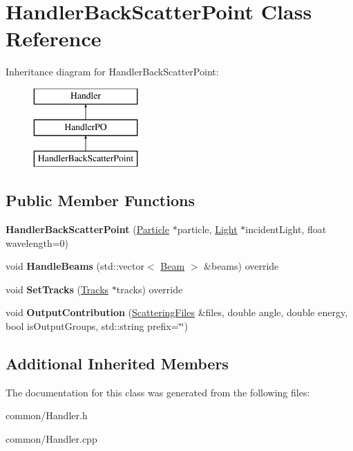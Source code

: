 \hypertarget{class_handler_back_scatter_point}{}\section{Handler\+Back\+Scatter\+Point Class Reference}
\label{class_handler_back_scatter_point}
Inheritance diagram for Handler\+Back\+Scatter\+Point\+:\begin{figure}[H]
\begin{center}
\leavevmode
\includegraphics[height=3.000000cm]{class_handler_back_scatter_point}
\end{center}
\end{figure}
\subsection*{Public Member Functions}
\begin{DoxyCompactItemize}
\item 
\mbox{\label{class_handler_back_scatter_point_ac1062d361d234fe7f17169cb878000dd}} 
{\bfseries Handler\+Back\+Scatter\+Point} (\mbox{\hyperlink{class_particle}{Particle}} $\ast$particle, \mbox{\hyperlink{class_light}{Light}} $\ast$incident\+Light, float wavelength=0)
\item 
\mbox{\label{class_handler_back_scatter_point_a3ce7fcb7530abbdfd8b1256d7e588536}} 
void {\bfseries Handle\+Beams} (std\+::vector$<$ \mbox{\hyperlink{class_beam}{Beam}} $>$ \&beams) override
\item 
\mbox{\label{class_handler_back_scatter_point_ac8e90fbda71ee4cde2b4ab92a9929edc}} 
void {\bfseries Set\+Tracks} (\mbox{\hyperlink{class_tracks}{Tracks}} $\ast$tracks) override
\item 
\mbox{\label{class_handler_back_scatter_point_a4316e06666856fd593118dcda1879974}} 
void {\bfseries Output\+Contribution} (\mbox{\hyperlink{class_scattering_files}{Scattering\+Files}} \&files, double angle, double energy, bool is\+Output\+Groups, std\+::string prefix=\char`\"{}\char`\"{})
\end{DoxyCompactItemize}
\subsection*{Additional Inherited Members}


The documentation for this class was generated from the following files\+:\begin{DoxyCompactItemize}
\item 
common/Handler.\+h\item 
common/Handler.\+cpp\end{DoxyCompactItemize}
